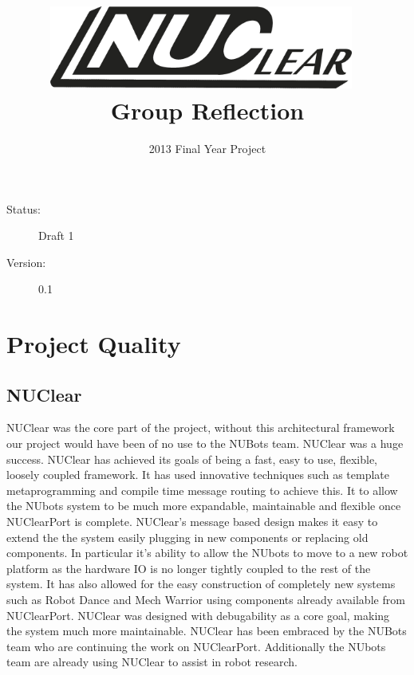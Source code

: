 \documentclass[english,12pt]{scrartcl}
\title{\includegraphics[width=0.75\textwidth]{./Logo/NUClear-logo}~\\[1cm] Group Reflection}
\author{2013 Final Year Project}
\begin{document}
	\maketitle
	\vfill
	{\large
		\begin{description}
			\item [Status:] Draft 1
			\item [Version:] 0.1
		\end{description}}

	\clearpage
	\tableofcontents
		
	\clearpage

\section{Project Quality}
	\subsection{NUClear}
		NUClear was the core part of the project, without this architectural framework our project would have been of no use to the NUBots team.
		NUClear was a huge success. NUClear has achieved its goals of being a fast, easy to use, flexible, loosely coupled framework.
		It has used innovative techniques such as template metaprogramming and compile time message routing to achieve this.
		It to allow the NUbots system to be much more expandable, maintainable and flexible once NUClearPort is complete.
		NUClear's message based design makes it easy to extend the the system easily plugging in new components or replacing old components.		
		In particular it's ability to allow the NUbots to move to a new robot platform as the hardware IO is no longer tightly coupled to the rest of the system.
		It has also allowed for the easy construction of completely new systems such as Robot Dance and Mech Warrior using components already available from NUClearPort.
		NUClear was designed with debugability as a core goal, making the system much more maintainable.
		NUClear has been embraced by the NUBots team who are continuing the work on NUClearPort.
		Additionally the NUbots team are already using NUClear to assist in robot research.
	
\end{document}

